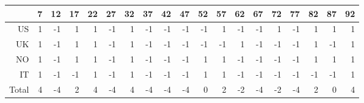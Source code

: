 \begin{table}[ht]
\centering
\begin{tabular}{rrrrrrrrrrrrrrrrrrr}
  \hline
 & 7 & 12 & 17 & 22 & 27 & 32 & 37 & 42 & 47 & 52 & 57 & 62 & 67 & 72 & 77 & 82 & 87 & 92 \\ 
  \hline
US & 1 & -1 & 1 & 1 & -1 & 1 & -1 & -1 & -1 & -1 & 1 & -1 & -1 & 1 & -1 & 1 & 1 & 1 \\ 
  UK & 1 & -1 & 1 & 1 & -1 & 1 & -1 & -1 & -1 & -1 & -1 & 1 & -1 & -1 & -1 & 1 & -1 & 1 \\ 
  NO & 1 & -1 & 1 & 1 & -1 & 1 & -1 & -1 & -1 & 1 & 1 & -1 & -1 & -1 & -1 & 1 & 1 & 1 \\ 
  IT & 1 & -1 & -1 & 1 & -1 & 1 & -1 & -1 & -1 & 1 & 1 & -1 & -1 & -1 & -1 & -1 & -1 & 1 \\ 
  Total & 4 & -4 & 2 & 4 & -4 & 4 & -4 & -4 & -4 & 0 & 2 & -2 & -4 & -2 & -4 & 2 & 0 & 4 \\ 
   \hline
\end{tabular}
\end{table}
